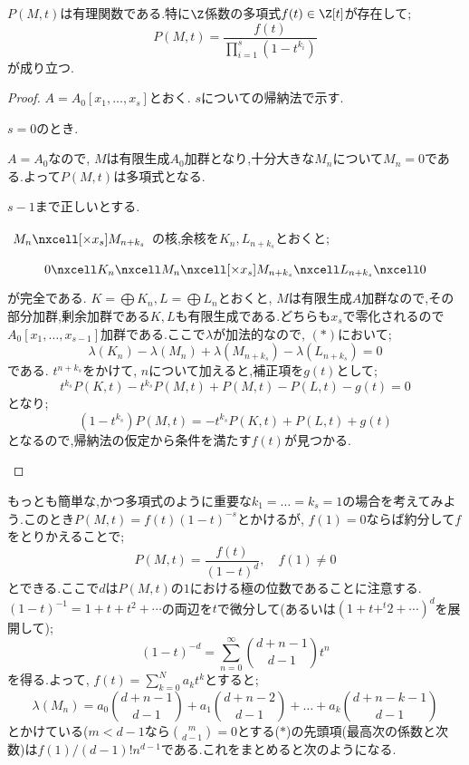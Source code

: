 \begin{thm}
	$P(M,t)$は有理関数である.特に$\Z$係数の多項式$f(t)\in\Z[t]$が存在して;
	\[P(M,t)=\frac{f(t)}{\prod_{i=1}^s(1-t^{k_i})}\]
	が成り立つ.
\end{thm}

\begin{proof}
	$A=A_0[x_1,\dots,x_s]$とおく. $s$についての帰納法で示す.
	\begin{step}
		\item $s=0$のとき.
		
		$A=A_0$なので, $M$は有限生成$A_0$加群となり,十分大きな$M_n$について$M_n=0$である.よって$P(M,t)$は多項式となる.
		
		\item $s-1$まで正しいとする.
		
		$\begin{tikzcd}
			M_n\nxcell[\times x_s]M_{n+k_s}
		\end{tikzcd}$の核,余核を$K_n,L_{n+k_s}$とおくと;
		\[\begin{tikzcd}
			0\nxcell K_n\nxcell M_n\nxcell[\times x_s]M_{n+k_s}\nxcell L_{n+k_s}\nxcell0
		\end{tikzcd}\]
		が完全である. $K=\bigoplus K_n,L=\bigoplus L_n$とおくと, $M$は有限生成$A$加群なので,その部分加群,剰余加群である$K,L$も有限生成である.どちらも$x_s$で零化されるので$A_0[x_1,\dots,x_{s-1}]$加群である.ここで$\lambda$が加法的なので, $(\ast)$において;
		\[\lambda(K_n)-\lambda(M_n)+\lambda(M_{n+k_s})-\lambda(L_{n+k_s})=0\]
		である. $t^{n+k_s}$をかけて, $n$について加えると,補正項を$g(t)$として;
		\[t^{k_s}P(K,t)-t^{k_s}P(M,t)+P(M,t)-P(L,t)-g(t)=0\]
		となり;
		\[(1-t^{k_s})P(M,t)=-t^{k_s}P(K,t)+P(L,t)+g(t)\]
		となるので,帰納法の仮定から条件を満たす$f(t)$が見つかる.
	\end{step}
\end{proof}

もっとも簡単な,かつ多項式のように重要な$k_1=\dots=k_s=1$の場合を考えてみよう.このとき$P(M,t)=f(t)(1-t)^{-s}$とかけるが, $f(1)=0$ならば約分して$f$をとりかえることで;
\[P(M,t)=\frac{f(t)}{(1-t)^d},\quad f(1)\neq0\]
とできる.ここで$d$は$P(M,t)$の$1$における極の位数であることに注意する. $(1-t)^{-1}=1+t+t^2+\cdots$の両辺を$t$で微分して(あるいは$(1+t+^t2+\cdots)^{d}$を展開して);
\[(1-t)^{-d}=\sum_{n=0}^\infty\binom{d+n-1}{d-1} t^n\]
を得る.よって, $f(t)=\sum_{k=0}^N a_kt^k$とすると;
\[\lambda(M_n)=a_0\binom{d+n-1}{d-1}+a_1\binom{d+n-2}{d-1}+\dots+a_k\binom{d+n-k-1}{d-1}\tag{$\ast$}\]
とかけている($m<d-1$なら$\binom{m}{d-1}=0$とする($\ast$)の先頭項(最高次の係数と次数)は$f(1)/(d-1)! n^{d-1}$である.これをまとめると次のようになる.

